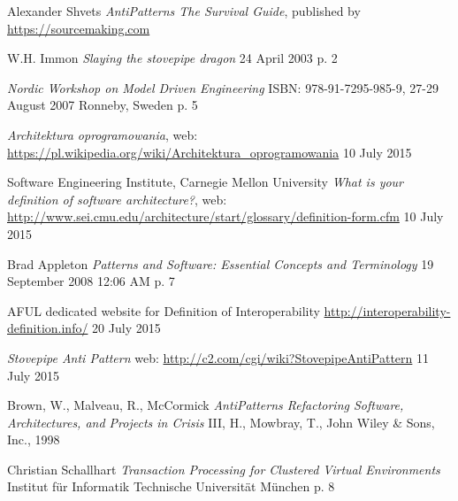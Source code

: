 \begin{thebibliography}{9}
     
    Alexander Shvets
    \emph{AntiPatterns The Survival Guide},
    published by \url{https://sourcemaking.com}
    
    W.H. Immon
    \emph{Slaying the stovepipe dragon}
    24 April 2003
    p. 2
    
    \emph{Nordic Workshop on Model Driven Engineering}
    ISBN: 978-91-7295-985-9,
    27-29 August 2007 Ronneby, Sweden
    p. 5
    
    \emph{Architektura oprogramowania},
    web: \url{https://pl.wikipedia.org/wiki/Architektura_oprogramowania}
    10 July 2015
    
    Software Engineering Institute, Carnegie Mellon University
    \emph{What is your definition of software architecture?},
    web: \url{http://www.sei.cmu.edu/architecture/start/glossary/definition-form.cfm}
    10 July 2015
    
     Brad Appleton
     \emph{Patterns and Software: Essential Concepts and Terminology}
     19 September 2008 12:06 AM
     p. 7
     
    AFUL dedicated website for Definition of Interoperability
    \url{http://interoperability-definition.info/}
    20 July 2015
     
    \emph{Stovepipe Anti Pattern}
    web: \url{http://c2.com/cgi/wiki?StovepipeAntiPattern}
    11 July 2015
    
    Brown, W., Malveau, R., McCormick
    \emph{AntiPatterns Refactoring Software, Architectures, and Projects in Crisis}
    III, H., Mowbray, T., John Wiley \& Sons, Inc., 1998
    
    Christian Schallhart
    \emph{Transaction Processing for Clustered Virtual Environments}
    Institut für Informatik
    Technische Universität München
    p. 8

    

\end{thebibliography}